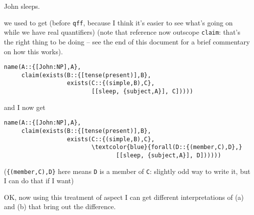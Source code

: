 \documentclass[11pt]{article}
\begin{document}
\begin{examples}
\item
John sleeps.
\end{examples}

\noindent
we used to get (before \texttt{qff}, because I think it's easier to
see what's going on while we have real quantifiers) (note that
reference now outscope \texttt{claim}: that's the right thing to be
doing -- see the end of this document for a brief commentary on how
this works).

\begin{Verbatim}[commandchars=\\\{\}]
name(A::{[John:NP],A},
     claim(exists(B::{[tense(present)],B},
                  exists(C::{(simple,B),C},
                         [[sleep, {subject,A}], C]))))
\end{Verbatim}

\noindent
and I now get 

\begin{Verbatim}[commandchars=\\\{\}]
name(A::{[John:NP],A},
     claim(exists(B::{[tense(present)],B},
                  exists(C::{(simple,B),C},
                         \textcolor{blue}{forall(D::{(member,C),D},}
                                [[sleep, {subject,A}], D])))))
\end{Verbatim}

\noindent
(\texttt{\{(member,C),D\}} here means \texttt{D} is a member of
\texttt{C}: slightly odd way to write it, but I can do that if I want)

OK, now using this treatment of aspect I can get different
interpretations of (a) and
(b) that bring out the difference.
\end{document}
